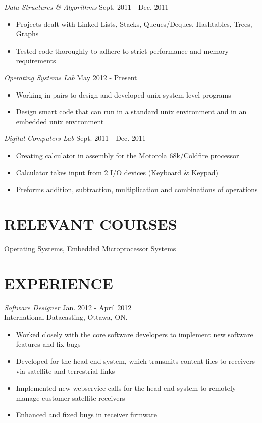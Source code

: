 \documentclass[margin]{res}
\begin{document}
\begin{resume}
		{\sl Data Structures \& Algorithms} \hfill Sept. 2011 - Dec. 2011
		\begin{itemize} \itemsep -2pt
			\item Projects dealt with Linked Lists, Stacks, Queues/Deques, Hashtables, Trees, Graphs
			\item Tested code thoroughly to adhere to strict performance and memory requirements
		\end{itemize}

		{\sl  Operating Systems Lab} \hfill May  2012 - Present
		\begin{itemize} \itemsep -2pt
			\item Working in pairs to design and developed unix system level programs
			\item  Design smart code that can run in a standard unix environment and in an embedded unix environment
		\end{itemize}

		{\sl Digital Computers Lab} \hfill Sept. 2011 - Dec. 2011
		\begin{itemize} \itemsep -2pt
			\item Creating calculator in assembly for the Motorola 68k/Coldfire processor
			\item Calculator takes input from 2 I/O devices (Keyboard \& Keypad)
			\item  Preforms addition, subtraction, multiplication and combinations of operations
		\end{itemize}


\section{RELEVANT COURSES} 
Operating Systems, Embedded Microprocessor Systems


 
\section{EXPERIENCE} 
{\sl Software Designer} \hfill Jan. 2012 - April 2012 \\
International Datacasting, Ottawa, ON.
\begin{itemize}  \itemsep -2pt %
	\item Worked closely with the core software developers to implement new software features and fix bugs
	\item Developed for the head-end system, which transmits content files to receivers via satellite and terrestrial links
	\item Implemented new webservice calls for the head-end system to remotely manage customer satellite receivers
	\item Enhanced and fixed bugs in receiver firmware
\end{itemize}



\end{resume}
\end{document}

